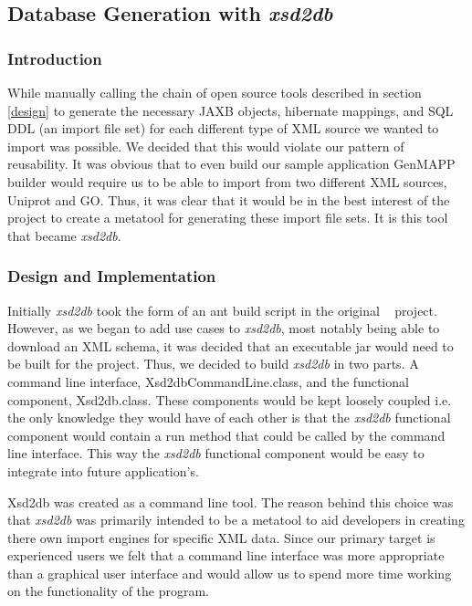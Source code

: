 \subsection{Database Generation with \emph{xsd2db}}
\label{xsd2db}
\subsubsection{Introduction}
While manually calling the chain of open source tools described in section \ref{design} to generate the necessary JAXB objects, hibernate mappings, and SQL DDL (an import file set) for each different type of XML source we wanted to import was possible.   We decided that this would violate our pattern of reusability.  It was obvious that to even build our sample application GenMAPP builder would require us to be able to import from two different XML sources, Uniprot and GO.   Thus, it was clear that it would be in the best interest of the project to create a metatool for generating these import file sets.  It is this tool that became \emph{xsd2db}.
    
\subsubsection{Design and Implementation}
Initially \emph{xsd2db} took the form of an ant build script in the original \xmlpipedb~ project.  However, as we began to add use cases to \emph{xsd2db}, most notably being able to download an XML schema,  it was decided that an executable jar would need to be built for the project.  Thus, we decided to build \emph{xsd2db} in two parts.  A command line interface, Xsd2dbCommandLine.class, and the functional component, Xsd2db.class.  These components would be kept loosely coupled i.e. the only knowledge they would have of each other is that  the \emph{xsd2db} functional component would contain a run method that could be called by the command line interface.  This way the \emph{xsd2db} functional component would be easy to integrate into future application's.

Xsd2db was created as a command line tool.  The reason behind this choice was that \emph{xsd2db} was primarily intended to be a metatool to aid developers in creating there own import engines for specific XML data.  Since our primary target is experienced users we felt that a command line interface was more appropriate than a graphical user interface and would allow us to spend more time working on the functionality of the program.    

